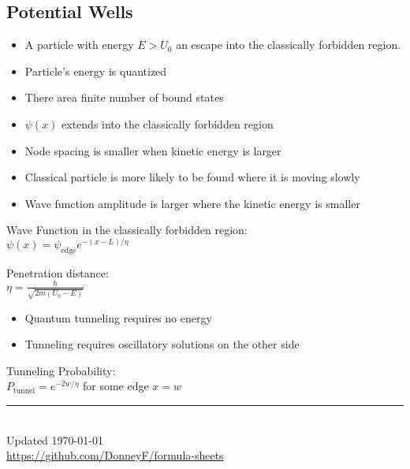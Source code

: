 \documentclass[12pt,landscape]{article}
\newcommand{\tab}{\hspace{.02\textwidth}}
\newcommand{\ds}{\displaystyle}
\begin{document}
\begin{multicols}{3}
	\subsection{Potential Wells}
	\begin{itemize}[leftmargin=0.5cm]
		\itemsep0em
		\item A particle with energy $E > U_0$ an escape into the classically forbidden region.
		\item Particle's energy is quantized
		\item There area finite number of bound states
		\item $\psi (x)$ extends into the classically forbidden region
		\item Node spacing is smaller when kinetic energy is larger
		\item Classical particle is more likely to be found where it is moving slowly
		\item Wave function amplitude is larger where the kinetic energy is smaller
	\end{itemize}
	Wave Function in the classically forbidden region:\\
	\tab $\psi (x) = \psi_{\text{edge}} e^{-(x-L)/\eta}$
	
	Penetration distance:\\
	\tab $\ds \eta = \frac{\hbar}{\sqrt{2m(U_0 - E)}}$
	
	\begin{itemize}[leftmargin=0.5cm]
		\itemsep0em
		\item Quantum tunneling requires no energy
		\item Tunneling requires oscillatory solutions on the other side
	\end{itemize}

	Tunneling Probability:\\
	\tab $P_{\text{tunnel}} = e^{-2w/\eta}$ for some edge $x=w$
	
	\rule{0.3\linewidth}{0.25pt}
	\scriptsize\\
	Updated \today\\
	\href{https://github.com/DonneyF/formula-sheets}{https://github.com/DonneyF/formula-sheets}
\end{multicols}
\end{document}
